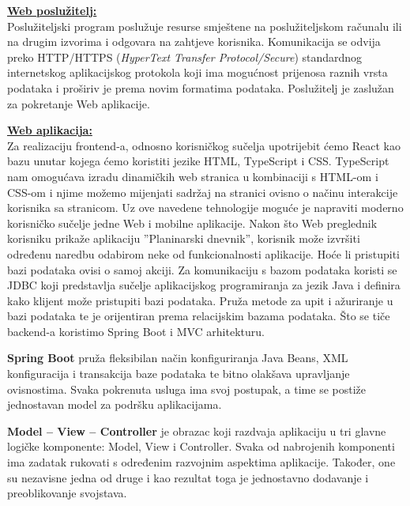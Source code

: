 		\vspace{5mm} %
		\textbf{\underline{Web poslužitelj:} }\\

		Poslužiteljski program poslužuje resurse smještene na poslužiteljskom računalu ili na drugim izvorima i odgovara na zahtjeve korisnika. Komunikacija se odvija preko HTTP/HTTPS (\textit{HyperText Transfer Protocol/Secure}) standardnog internetskog aplikacijskog protokola koji ima mogućnost prijenosa raznih vrsta podataka i proširiv je prema novim formatima podataka. Poslužitelj je zaslužan za pokretanje Web aplikacije.

		\vspace{5mm} %
		
		\textbf{\underline{Web aplikacija:} }\\

		Za realizaciju frontend-a, odnosno korisničkog sučelja upotrijebit ćemo React kao bazu unutar kojega ćemo koristiti jezike HTML, TypeScript i CSS. TypeScript nam omogućava izradu dinamičkih web stranica u kombinaciji s HTML-om i CSS-om i njime možemo mijenjati sadržaj na stranici ovisno o načinu interakcije korisnika sa stranicom. Uz ove navedene tehnologije moguće je napraviti moderno korisničko sučelje jedne Web i mobilne aplikacije. Nakon što Web preglednik korisniku prikaže aplikaciju ''Planinarski dnevnik'', korisnik može izvršiti određenu naredbu odabirom neke od funkcionalnosti aplikacije. Hoće li pristupiti bazi podataka ovisi o samoj akciji. Za komunikaciju s bazom podataka koristi se JDBC koji predstavlja sučelje aplikacijskog programiranja za jezik Java i definira kako klijent može pristupiti bazi podataka. Pruža metode za upit i ažuriranje u bazi podataka te je orijentiran prema relacijskim bazama podataka. Što se tiče backend-a koristimo Spring Boot i MVC arhitekturu. 


		\vspace{5mm} %

		\textbf{Spring Boot} pruža fleksibilan način konfiguriranja Java Beans, XML konfiguracija i transakcija baze podataka te bitno olakšava upravljanje ovisnostima. Svaka pokrenuta usluga ima svoj postupak, a time se postiže jednostavan model za podršku aplikacijama.  


		\vspace{5mm} %

		\textbf{Model – View – Controller} je obrazac koji razdvaja aplikaciju u tri glavne logičke komponente: Model, View i Controller. Svaka od nabrojenih komponenti ima zadatak rukovati s određenim razvojnim aspektima aplikacije. Također, one su nezavisne jedna od druge i kao rezultat toga je jednostavno dodavanje i preoblikovanje svojstava.


